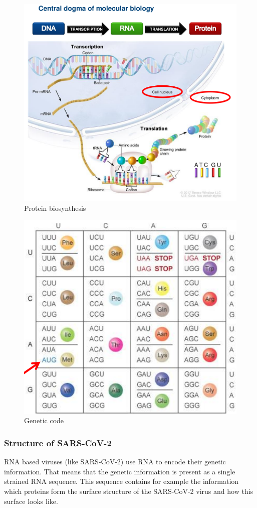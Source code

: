 \begin{figure}[ht!]
	\centering
	\includegraphics[width=0.9\linewidth]{figures/dogmaMolecularBiology.png}
	\caption{Protein biosynthesis \cite[p. 6]{schererStatisticalGeneticsGenetic2021}}
	\label{protein_biosynthesis}
\end{figure}

\begin{figure}[ht!]
	\centering
	\includegraphics[width=0.5\linewidth]{figures/geneticCode.png}
	\caption{Genetic code \cite[p. 10]{schererStatisticalGeneticsGenetic2021}}
	\label{genetic_code}
\end{figure}


\subsubsection{Structure of \ac{SARS-CoV-2}} \label{fundamentalsA0c}

\ac{RNA} based viruses (like \ac{SARS-CoV-2}) use \ac{RNA} to encode their genetic information. That means that the genetic information is present as a single strained \ac{RNA} sequence. This sequence contains for example the information which proteins form the surface structure of the SARS-CoV-2 virus and how this surface looks like. \cite{NAQVI2020165878}

